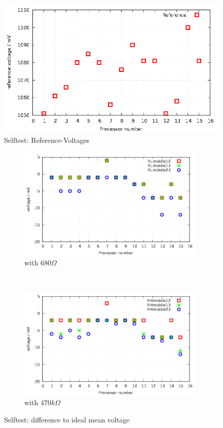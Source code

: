 \begin{figure}[H]
\centering
\includegraphics[width=16cm]{../GNU/SelfTref.pdf}
\caption{Selftest: Reference-Voltages}
\label{fig:SelfTref}
\end{figure}


\begin{figure}[H]
  \begin{subfigure}[b]{9cm}
    \centering
    \includegraphics[width=9cm]{../GNU/SelfTMitL.pdf}
    \caption{with \(680\Omega\)}
    \label{fig:SelfTMitL}
  \end{subfigure}
  ~
  \begin{subfigure}[b]{9cm}
    \centering
    \includegraphics[width=9cm]{../GNU/SelfTMitH.pdf}
    \caption{with \(470k\Omega\)}
    \label{fig:SelfTMitH}
  \end{subfigure}
  \caption{Selftest: difference to ideal mean voltage}
\end{figure}

